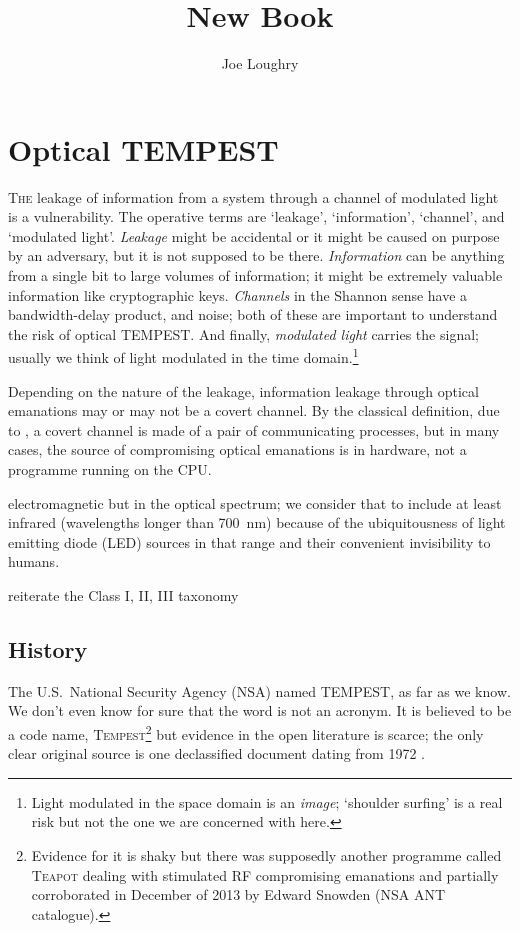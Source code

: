 \documentclass[a4paper,twoside]{book}
\begin{document}
\title{New Book}
\author{Joe Loughry}
\setcounter{chapter}{6} %
\chapter{Optical TEMPEST}
\lettrine[lines=3]{T}{he} leakage of information from a system through a
channel of modulated light is a vulnerability. The operative terms are `leakage',
`information', `channel', and `modulated light'. \emph{Leakage} might be
accidental or it might be caused on purpose by an adversary, but it is not
supposed to be there. \emph{Information} can be anything from a single bit to
large volumes of information; it might be extremely valuable information like
cryptographic keys. \emph{Channels} in the Shannon sense\cite{Shannon1948}
have a bandwidth-delay product, and noise; both of these are important to
understand the risk of optical TEMPEST. And finally, \emph{modulated light}
carries the signal; usually we think of light modulated in the time
domain.\footnote{Light modulated in the space domain is an \emph{image};
`shoulder surfing' is a real risk but not the one we are concerned with
here.}

Depending on the nature of the leakage, information leakage through optical
emanations may or may not be a covert channel. By the classical definition,
due to \cite{Lampson1973}, a covert channel is made of a pair of communicating
processes, but in many cases, the source of compromising optical emanations
is in hardware, not a programme running on the CPU.

electromagnetic but in the optical spectrum; we consider that to include at
least infrared (wavelengths longer than \SI{700}{\nano\metre}) because of the
ubiquitousness of light emitting diode (LED) sources in that range and their
convenient invisibility to humans.

reiterate the Class I, II, III taxonomy

\section{History}
The U.S.\ National Security Agency (NSA) named TEMPEST, as far as we know. We
don't even know for sure that the word is not an acronym. It is believed to
be a code name, \textsc{Tempest}\footnote{Evidence for it is shaky but there
was supposedly another programme called \textsc{Teapot} dealing with
stimulated RF compromising emanations \cite[p.~539]{Anderson2008a} and
partially corroborated in December of 2013 by Edward Snowden (NSA ANT
catalogue).} but evidence in the open literature is scarce; the only clear
original source is one declassified document dating from 1972
\cite{NSAtempest2007}.
\end{document}
